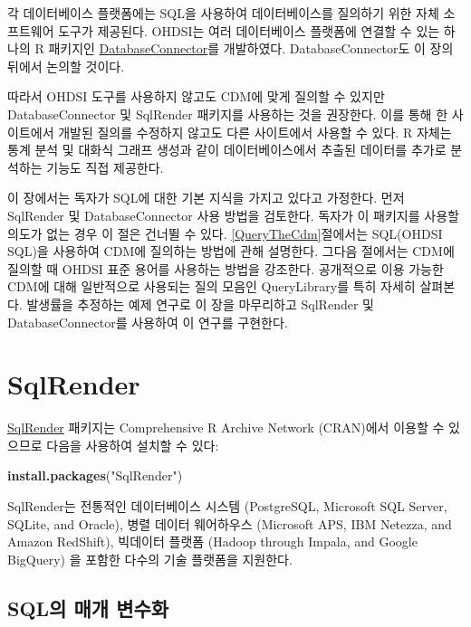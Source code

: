 \documentclass[10.5pt]{book}
\newenvironment{Shaded}{\begin{snugshade}}{\end{snugshade}}
\newcommand{\KeywordTok}[1]{\textcolor[rgb]{0.13,0.29,0.53}{\textbf{#1}}}
\newcommand{\StringTok}[1]{\textcolor[rgb]{0.31,0.60,0.02}{#1}}
\newcommand{\NormalTok}[1]{#1}
\theoremstyle{definition}
\theoremstyle{definition}
\theoremstyle{definition}
\theoremstyle{remark}
\begin{document}
각 데이터베이스 플랫폼에는 SQL을 사용하여 데이터베이스를 질의하기 위한
자체 소프트웨어 도구가 제공된다. OHDSI는 여러 데이터베이스 플랫폼에
연결할 수 있는 하나의 R 패키지인
\href{https://ohdsi.github.io/DatabaseConnector/}{DatabaseConnector}를
개발하였다. DatabaseConnector도 이 장의 뒤에서 논의할 것이다.

따라서 OHDSI 도구를 사용하지 않고도 CDM에 맞게 질의할 수 있지만
DatabaseConnector 및 SqlRender 패키지를 사용하는 것을 권장한다. 이를
통해 한 사이트에서 개발된 질의를 수정하지 않고도 다른 사이트에서 사용할
수 있다. R 자체는 통계 분석 및 대화식 그래프 생성과 같이
데이터베이스에서 추출된 데이터를 추가로 분석하는 기능도 직접 제공한다.

이 장에서는 독자가 SQL에 대한 기본 지식을 가지고 있다고 가정한다. 먼저
SqlRender 및 DatabaseConnector 사용 방법을 검토한다. 독자가 이 패키지를
사용할 의도가 없는 경우 이 절은 건너뛸 수 있다.
\ref{QueryTheCdm}절에서는 SQL(OHDSI SQL)을 사용하여 CDM에 질의하는
방법에 관해 설명한다. 그다음 절에서는 CDM에 질의할 때 OHDSI 표준 용어를
사용하는 방법을 강조한다. 공개적으로 이용 가능한 CDM에 대해 일반적으로
사용되는 질의 모음인 QueryLibrary를 특히 자세히 살펴본다. 발생률을
추정하는 예제 연구로 이 장을 마무리하고 SqlRender 및 DatabaseConnector를
사용하여 이 연구를 구현한다. 

\hypertarget{SqlRender}{\section{SqlRender}\label{SqlRender}}

\href{https://ohdsi.github.io/SqlRender/}{SqlRender} 패키지는
Comprehensive R Archive Network (CRAN)에서 이용할 수 있으므로 다음을
사용하여 설치할 수 있다:

\begin{Shaded}
\begin{Highlighting}[]
\KeywordTok{install.packages}\NormalTok{(}\StringTok{"SqlRender"}\NormalTok{)}
\end{Highlighting}
\end{Shaded}

SqlRender는 전통적인 데이터베이스 시스템 (PostgreSQL, Microsoft SQL
Server, SQLite, and Oracle), 병렬 데이터 웨어하우스 (Microsoft APS, IBM
Netezza, and Amazon RedShift), 빅데이터 플랫폼 (Hadoop through Impala,
and Google BigQuery) 을 포함한 다수의 기술 플랫폼을 지원한다.

\subsection{SQL의 매개 변수화}\label{sql--}
\end{document}
